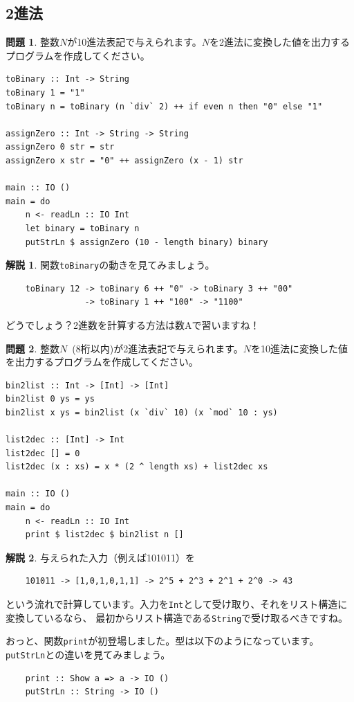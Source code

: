 \documentclass[12pt,a4paper,dvipdfmx,fleqn]{article}%
\theoremstyle{definition}
\newtheorem*{toi*}{問題}
\theoremstyle{definition}
\newtheorem*{ans*}{解説}
\theoremstyle{definition}
\begin{document}
\subsection{2進法}\label{2進法}
\begin{toi*}
    整数$N$が10進法表記で与えられます。$N$を2進法に変換した値を出力するプログラムを作成してください。
\end{toi*}
\begin{lstlisting}[caption=A04.hs,label=A04]
toBinary :: Int -> String
toBinary 1 = "1"
toBinary n = toBinary (n `div` 2) ++ if even n then "0" else "1"

assignZero :: Int -> String -> String
assignZero 0 str = str
assignZero x str = "0" ++ assignZero (x - 1) str

main :: IO ()
main = do
    n <- readLn :: IO Int
    let binary = toBinary n
    putStrLn $ assignZero (10 - length binary) binary
\end{lstlisting}
\begin{ans*}
    関数\texttt{toBinary}の動きを見てみましょう。
    \begin{verbatim}
    toBinary 12 -> toBinary 6 ++ "0" -> toBinary 3 ++ "00"
                -> toBinary 1 ++ "100" -> "1100"
    \end{verbatim}
    \vspace*{-4mm}
    どうでしょう？2進数を計算する方法は数Aで習いますね！
\end{ans*}
\begin{toi*}
    整数$N$~(8桁以内)が2進法表記で与えられます。$N$を10進法に変換した値を出力するプログラムを作成してください。
\end{toi*}
\begin{lstlisting}[caption=B04.hs,label=B04]
bin2list :: Int -> [Int] -> [Int]
bin2list 0 ys = ys
bin2list x ys = bin2list (x `div` 10) (x `mod` 10 : ys)

list2dec :: [Int] -> Int
list2dec [] = 0
list2dec (x : xs) = x * (2 ^ length xs) + list2dec xs

main :: IO ()
main = do
    n <- readLn :: IO Int
    print $ list2dec $ bin2list n []
\end{lstlisting}
\begin{ans*}
    与えられた入力（例えば101011）を
    \begin{verbatim}
    101011 -> [1,0,1,0,1,1] -> 2^5 + 2^3 + 2^1 + 2^0 -> 43
    \end{verbatim}
    \vspace*{-4mm}
    という流れで計算しています。入力を\texttt{Int}として受け取り、それをリスト構造に変換しているなら、
    最初からリスト構造である\texttt{String}で受け取るべきですね。\par
    おっと、関数\texttt{print}が初登場しました。型は以下のようになっています。
    \texttt{putStrLn}との違いを見てみましょう。
    \begin{verbatim}
    print :: Show a => a -> IO ()
    putStrLn :: String -> IO ()
    \end{verbatim}
    \vspace*{-4mm}
\end{ans*}
\end{document}
